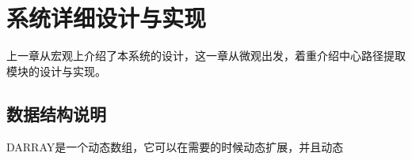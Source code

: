 \chapter{系统详细设计与实现}

上一章从宏观上介绍了本系统的设计，这一章从微观出发，着重介绍中心路径提取模块的设计与实现。
\section{数据结构说明}

DARRAY是一个动态数组，它可以在需要的时候动态扩展，并且动态
